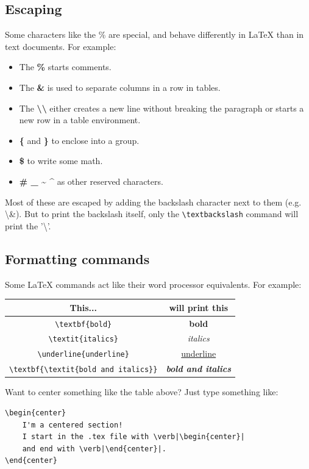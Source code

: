 \documentclass[en,inscr,ack,preface]{dimscthesis}
\begin{document}
\subsection{Escaping} \label{escaping}
Some characters like the \% are special, and behave differently in \LaTeX{} than in text documents.
For example:
\begin{itemize}
    \item The \textbf{\%} starts comments.
    \item The \textbf{\&} is used to separate columns in a row in tables.
    \item The \textbf{\textbackslash\textbackslash} either creates a new line without breaking the paragraph or starts a new row in a table environment.
    \item \textbf{\{} and \textbf{\}} to enclose into a group.
    \item \textbf{\$} to write some math.
    \item \textbf{\# \_ \~{} \^{}} as other reserved characters.
\end{itemize}

Most of these are escaped by adding the backslash character next to them (e.g. \textbackslash\&).
But to print the backslash itself, only the \verb|\textbackslash| command will print the '\textbackslash'.

\subsection{Formatting commands} \label{formatting_commands}

Some \LaTeX{} commands act like their word processor equivalents.
For example:

\begin{center}
    \begin{tabular}{c|c}
        This... & will print this \\
        \hline
        \verb|\textbf{bold}| & \textbf{bold} \\
        \verb|\textit{italics}| & \textit{italics} \\
        \verb|\underline{underline}| & \underline{underline} \\
        \verb|\textbf{\textit{bold and italics}}| & \textbf{\textit{bold and italics}}
    \end{tabular}
\end{center}

Want to center something like the table above?
Just type something like:
\begin{verbatim}
\begin{center}
    I'm a centered section!
    I start in the .tex file with \verb|\begin{center}|
    and end with \verb|\end{center}|.
\end{center}
\end{verbatim}
\end{document}
